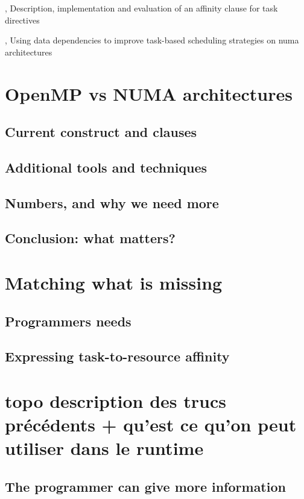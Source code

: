 

\cite{Virouleau2016}, Description, implementation and evaluation of an affinity clause for task directives

\cite{Virouleau2016b}, Using data dependencies to improve task-based scheduling strategies on numa architectures


\section{OpenMP vs NUMA architectures}

\subsection{Current construct and clauses}
\subsection{Additional tools and techniques}
\subsection{Numbers, and why we need more}
\subsection{Conclusion: what matters?}

\section{Matching what is missing}
\subsection{Programmers needs}
\subsection{Expressing task-to-resource affinity}

\section{topo description des trucs précédents + qu'est ce qu'on peut utiliser dans le runtime}
\subsection{The programmer can give more information}
